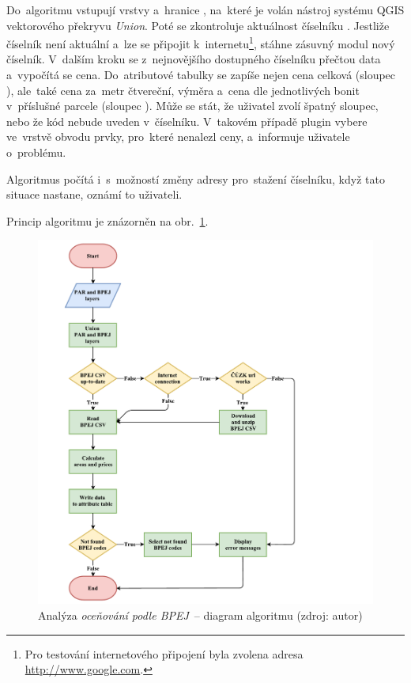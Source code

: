 Do~algoritmu vstupují vrstvy \texttt{} a~hranice ,
na~které je volán nástroj systému QGIS vektorového překryvu \textit{Union}. Poté se
zkontroluje aktuálnost číselníku . Jestliže číselník není
aktuální a~lze se připojit k~internetu\footnote{Pro testování
internetového připojení byla zvolena adresa
\url{http://www.google.com}.}, stáhne zásuvný modul nový
číselník. V~dalším kroku se z~nejnovějšího dostupného číselníku
přečtou data a~vypočítá se cena. Do~atributové tabulky se zapíše nejen
cena celková (sloupec \texttt{}), ale~také cena
za~metr čtvereční, výměra a~cena dle jednotlivých bonit v~příslušné
parcele (sloupec
\texttt{}). Může se stát, že
uživatel zvolí špatný sloupec, nebo že kód  nebude uveden
v~číselníku. V~takovém případě plugin vybere ve~vrstvě obvodu prvky,
pro~které nenalezl ceny, a~informuje uživatele o~problému.

Algoritmus počítá i~s~možností změny adresy pro~stažení číselníku,
když tato situace nastane, oznámí to uživateli.

Princip algoritmu je znázorněn na obr.~\ref{fig:diagram_bpej}.

	\begin{figure}[H] %
		\includegraphics[width=1.2\textwidth]{./pictures/bpej.pdf}
		\caption[Analýza \textit{oceňování podle BPEJ}~–
diagram algoritmu]{Analýza \textit{oceňování podle BPEJ}~– diagram
algoritmu (zdroj: autor)}
		\label{fig:diagram_bpej}
 	\end{figure}

